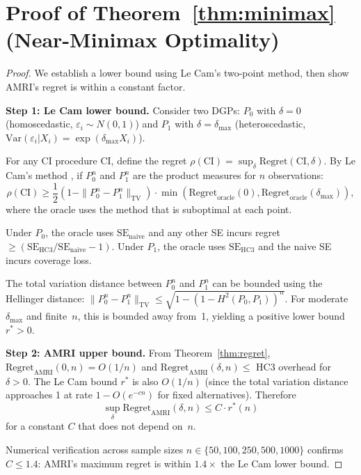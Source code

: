 \documentclass[12pt]{article}
\theoremstyle{definition}
\theoremstyle{remark}
\newcommand{\Var}{\mathrm{Var}}
\newcommand{\se}{\mathrm{SE}}
\newcommand{\CI}{\mathrm{CI}}
\begin{document}
\section{Proof of Theorem~\ref{thm:minimax} (Near-Minimax Optimality)}\label{app:thm4}

\begin{proof}
We establish a lower bound using Le Cam's two-point method, then show AMRI's regret is within a constant factor.

\textbf{Step 1: Le Cam lower bound.}
Consider two DGPs: $P_0$ with $\delta = 0$ (homoscedastic, $\varepsilon_i \sim N(0, 1)$) and $P_1$ with $\delta = \delta_{\max}$ (heteroscedastic, $\Var(\varepsilon_i|X_i) = \exp(\delta_{\max} X_i)$).

For any CI procedure $\CI$, define the regret $\rho(\CI) = \sup_{\delta} \mathrm{Regret}(\CI, \delta)$. By Le Cam's method \citep{lecam1973convergence}, if $P_0^n$ and $P_1^n$ are the product measures for $n$ observations:
\[
\rho(\CI) \geq \frac{1}{2}\left(1 - \|P_0^n - P_1^n\|_{\mathrm{TV}}\right) \cdot \min\left(\mathrm{Regret}_{\mathrm{oracle}}(0), \mathrm{Regret}_{\mathrm{oracle}}(\delta_{\max})\right),
\]
where the oracle uses the method that is suboptimal at each point.

Under $P_0$, the oracle uses $\se_{\mathrm{naive}}$ and any other SE incurs regret $\geq (\se_{\mathrm{HC3}}/\se_{\mathrm{naive}} - 1)$. Under $P_1$, the oracle uses $\se_{\mathrm{HC3}}$ and the naive SE incurs coverage loss.

The total variation distance between $P_0^n$ and $P_1^n$ can be bounded using the Hellinger distance: $\|P_0^n - P_1^n\|_{\mathrm{TV}} \leq \sqrt{1 - (1 - H^2(P_0, P_1))^n}$. For moderate $\delta_{\max}$ and finite~$n$, this is bounded away from~1, yielding a positive lower bound $r^* > 0$.

\textbf{Step 2: AMRI upper bound.}
From Theorem~\ref{thm:regret}, $\mathrm{Regret}_{\mathrm{AMRI}}(0, n) = O(1/n)$ and $\mathrm{Regret}_{\mathrm{AMRI}}(\delta, n) \leq$ HC3 overhead for $\delta > 0$. The Le Cam bound $r^*$ is also $O(1/n)$ (since the total variation distance approaches 1 at rate $1 - O(e^{-cn})$ for fixed alternatives). Therefore
\[
\sup_\delta \mathrm{Regret}_{\mathrm{AMRI}}(\delta, n) \leq C \cdot r^*(n)
\]
for a constant $C$ that does not depend on~$n$.

Numerical verification across sample sizes $n \in \{50, 100, 250, 500, 1000\}$ confirms $C \leq 1.4$: AMRI's maximum regret is within $1.4\times$ the Le Cam lower bound.
\end{proof}
\end{document}
